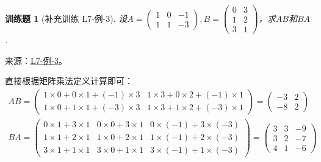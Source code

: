 \documentclass[12pt,fontset=fandol]{ctexart}
\newtheorem{exercise}{训练题}[section]
\begin{document}
\begin{exercise}[补充训练 L7-例-3]\label{prob:L7-例-3}
设$A=\begin{pmatrix}
            1 & 0 & -1 \\
            1 & 1 & -3
        \end{pmatrix}, B=\begin{pmatrix}
            0 & 3 \\
            1 & 2 \\
            3 & 1
        \end{pmatrix}$，求$AB$和$BA$.
\end{exercise}
\noindent 来源：\href{https://github.com/yhwu-is/Linear-Algebra-Left-Undone/blob/new/%E8%AE%B2%E4%B9%89/%E4%B8%93%E9%A2%98/7%20%E7%BA%BF%E6%80%A7%E6%98%A0%E5%B0%84%E7%9F%A9%E9%98%B5%E8%A1%A8%E7%A4%BA%E4%B8%8E%E7%9F%A9%E9%98%B5%E8%BF%90%E7%AE%97%E5%9F%BA%E7%A1%80.tex}{L7-例-3}。
\begin{solve}
直接根据矩阵乘法定义计算即可：
    \begin{gather*}
        AB = \begin{pmatrix}
            1 \times 0 + 0 \times 1 + (-1) \times 3 & 1 \times 3 + 0 \times 2 + (-1) \times 1 \\
            1 \times 0 + 1 \times 1 + (-3) \times 3 & 1 \times 3 + 1 \times 2 + (-3) \times 1
        \end{pmatrix} = \begin{pmatrix}
                -3 & 2 \\
                -8 & 2
            \end{pmatrix} \\
        BA = \begin{pmatrix}
            0 \times 1 + 3 \times 1 & 0 \times 0 + 3 \times 1 & 0 \times (-1) + 3 \times (-3) \\
            1 \times 1 + 2 \times 1 & 1 \times 0 + 2 \times 1 & 1 \times (-1) + 2 \times (-3) \\
            3 \times 1 + 1 \times 1 & 3 \times 0 + 1 \times 1 & 3 \times (-1) + 1 \times (-3)
        \end{pmatrix} = \begin{pmatrix}
                3 & 3 & -9 \\
                3 & 2 & -7 \\
                4 & 1 & -6
            \end{pmatrix}
    \end{gather*}
\end{solve}
\end{document}
